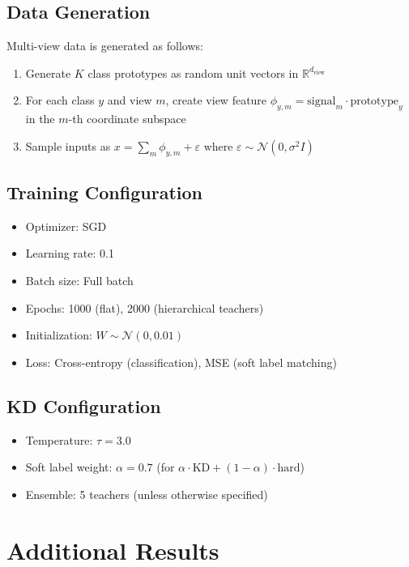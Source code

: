 \documentclass{article}
\newcommand{\R}{\mathbb{R}}
\begin{document}
\subsection{Data Generation}

Multi-view data is generated as follows:
\begin{enumerate}
    \item Generate $K$ class prototypes as random unit vectors in $\R^{d_{\text{view}}}$
    \item For each class $y$ and view $m$, create view feature $\phi_{y,m} = \text{signal}_m \cdot \text{prototype}_y$ in the $m$-th coordinate subspace
    \item Sample inputs as $x = \sum_m \phi_{y,m} + \varepsilon$ where $\varepsilon \sim \mathcal{N}(0, \sigma^2 I)$
\end{enumerate}

\subsection{Training Configuration}

\begin{itemize}
    \item Optimizer: SGD
    \item Learning rate: 0.1
    \item Batch size: Full batch
    \item Epochs: 1000 (flat), 2000 (hierarchical teachers)
    \item Initialization: $W \sim \mathcal{N}(0, 0.01)$
    \item Loss: Cross-entropy (classification), MSE (soft label matching)
\end{itemize}

\subsection{KD Configuration}

\begin{itemize}
    \item Temperature: $\tau = 3.0$
    \item Soft label weight: $\alpha = 0.7$ (for $\alpha \cdot \text{KD} + (1-\alpha) \cdot \text{hard}$)
    \item Ensemble: 5 teachers (unless otherwise specified)
\end{itemize}

\section{Additional Results}
\label{app:results}
\end{document}
